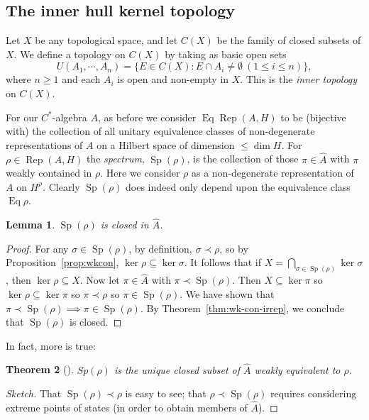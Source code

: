 \documentclass[a4paper,11pt]{article}
\newcommand{\Rep}{\operatorname{Rep}}
\newcommand{\Eq}{\operatorname{Eq}}
\newcommand{\Sp}{\operatorname{Sp}}
\newtheorem{lemma}{Lemma}[section]
\newtheorem{theorem}[lemma]{Theorem}
\begin{document}
\subsection{The inner hull kernel topology}\label{sec:innertop}

Let $X$ be any topological space, and let $C(X)$ be the family of closed subsets
of $X$.  We define a topology on $C(X)$ by taking as basic open sets
\[ U(A_1,\cdots,A_n) = \{ E\in C(X) : E \cap A_i\not=\emptyset \ (1 \leq i
\leq n) \}, \]
where $n\geq 1$ and each $A_i$ is open and non-empty in $X$.  This is the
\emph{inner topology} on $C(X)$.

For our $C^*$-algebra $A$, as before we consider $\Eq\Rep(A,H)$ to be (bijective
with) the collection of all unitary equivalence classes of non-degenerate
representations of $A$ on a Hilbert space of dimension $\leq\dim H$.  For
$\rho\in\Rep(A,H)$ the \emph{spectrum}, $\Sp(\rho)$, is the collection of those
$\pi\in\hat A$ with $\pi$ weakly contained in $\rho$.  Here we consider $\rho$
as a non-degenerate representation of $A$ on $H^\rho$.  Clearly $\Sp(\rho)$ does 
indeed only depend upon the equivalence class $\Eq\rho$.

\begin{lemma}
$\Sp(\rho)$ is closed in $\hat A$.
\end{lemma}
\begin{proof}
For any $\sigma\in\Sp(\rho)$, by definition, $\sigma\prec\rho$, so by
Proposition~\ref{prop:wkcon}, $\ker\rho \subseteq\ker\sigma$.  It follows
that if $X = \bigcap_{\sigma\in\Sp(\rho)} \ker \sigma$, then $\ker\rho \subseteq
X$.  Now let $\pi\in\hat A$ with $\pi\prec\Sp(\rho)$.  Then $X\subseteq\ker\pi$
so $\ker\rho \subseteq\ker\pi$ so $\pi\prec\rho$ so $\pi\in\Sp(\rho)$.  We have
shown that $\pi\prec\Sp(\rho) \implies \pi\in\Sp(\rho)$.  By 
Theorem~\ref{thm:wk-con-irrep}, we conclude that $\Sp(\rho)$ is closed.
\end{proof}

In fact, more is true:

\begin{theorem}[{\cite[Theorem~1.6]{fell4}}]\label{thm:spec_closure}
$Sp(\rho)$ is the unique closed subset of $\hat A$ weakly equivalent to $\rho$.
\end{theorem}
\begin{proof}[Sketch]
That $\Sp(\rho) \prec \rho$ is easy to see; that $\rho \prec \Sp(\rho)$ requires
considering extreme points of states (in order to obtain members of $\hat A$).
\end{proof}
\end{document}
